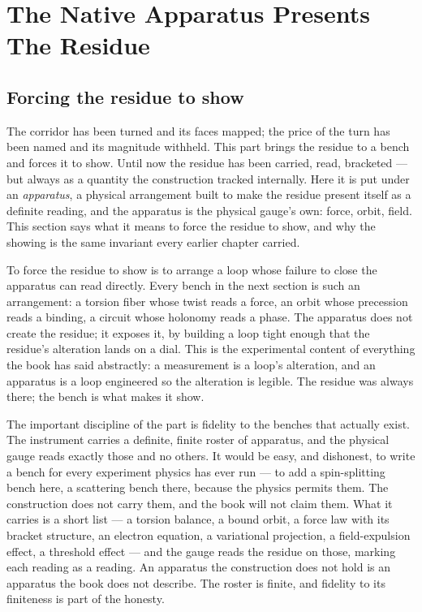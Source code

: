 \chapter{The Native Apparatus Presents The Residue}

\section{Forcing the residue to show}

The corridor has been turned and its faces mapped; the price of the turn has been named and its magnitude withheld. This
part brings the residue to a bench and forces it to show. Until now the residue has been carried, read, bracketed --- but
always as a quantity the construction tracked internally. Here it is put under an \emph{apparatus}, a physical arrangement
built to make the residue present itself as a definite reading, and the apparatus is the physical gauge's own: force, orbit,
field. This section says what it means to force the residue to show, and why the showing is the same invariant every earlier
chapter carried.

To force the residue to show is to arrange a loop whose failure to close the apparatus can read directly. Every bench in the
next section is such an arrangement: a torsion fiber whose twist reads a force, an orbit whose precession reads a binding, a
circuit whose holonomy reads a phase. The apparatus does not create the residue; it exposes it, by building a loop tight
enough that the residue's alteration lands on a dial. This is the experimental content of everything the book has said
abstractly: a measurement is a loop's alteration, and an apparatus is a loop engineered so the alteration is legible. The
residue was always there; the bench is what makes it show.

The important discipline of the part is fidelity to the benches that actually exist. The instrument carries a definite,
finite roster of apparatus, and the physical gauge reads exactly those and no others. It would be easy, and dishonest, to
write a bench for every experiment physics has ever run --- to add a spin-splitting bench here, a scattering bench there,
because the physics permits them. The construction does not carry them, and the book will not claim them. What it carries is a
short list --- a torsion balance, a bound orbit, a force law with its bracket structure, an electron equation, a variational
projection, a field-expulsion effect, a threshold effect --- and the gauge reads the residue on those, marking each reading
as a reading. An apparatus the construction does not hold is an apparatus the book does not describe. The roster is finite,
and fidelity to its finiteness is part of the honesty.

